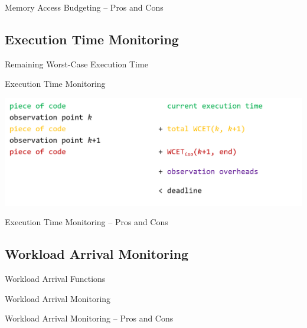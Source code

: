\begin{frame}{Memory Access Budgeting -- Pros and Cons}

\end{frame}

\subsection{Execution Time Monitoring}

\begin{frame}{Remaining Worst-Case Execution Time}

\end{frame}

\begin{frame}{Execution Time Monitoring}

\includegraphics[width=\textwidth]{Figures/exec-time-monitoring-robin}

\end{frame}


\begin{frame}{Execution Time Monitoring -- Pros and Cons}

\end{frame}


\subsection{Workload Arrival Monitoring}

\begin{frame}{Workload Arrival Functions}

\end{frame}

\begin{frame}{Workload Arrival Monitoring}

\end{frame}


\begin{frame}{Workload Arrival Monitoring -- Pros and Cons}

\end{frame}

